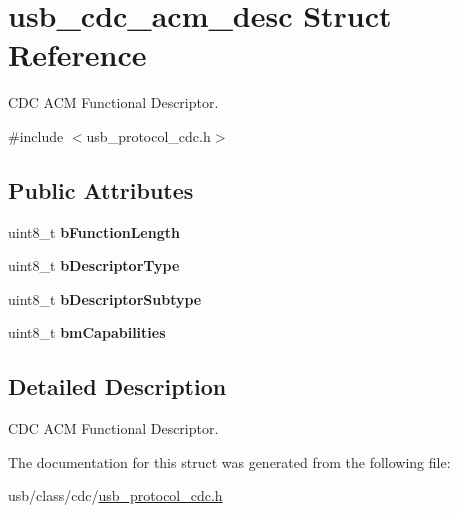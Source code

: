 \hypertarget{structusb__cdc__acm__desc}{}\section{usb\+\_\+cdc\+\_\+acm\+\_\+desc Struct Reference}
\label{structusb__cdc__acm__desc}


C\+DC A\+CM Functional Descriptor.  




{\ttfamily \#include $<$usb\+\_\+protocol\+\_\+cdc.\+h$>$}

\subsection*{Public Attributes}
\begin{DoxyCompactItemize}
\item 
\mbox{\label{structusb__cdc__acm__desc_a035fc7ee5ee746794256d7fd8de0ab3a}} 
uint8\+\_\+t {\bfseries b\+Function\+Length}
\item 
\mbox{\label{structusb__cdc__acm__desc_aa86418c5a633783e4c8f3af866d09d00}} 
uint8\+\_\+t {\bfseries b\+Descriptor\+Type}
\item 
\mbox{\label{structusb__cdc__acm__desc_aba54e9cf6a941870ca1810ce4f39465b}} 
uint8\+\_\+t {\bfseries b\+Descriptor\+Subtype}
\item 
\mbox{\label{structusb__cdc__acm__desc_a175b77082a65c2232cc5650d720b86f4}} 
uint8\+\_\+t {\bfseries bm\+Capabilities}
\end{DoxyCompactItemize}


\subsection{Detailed Description}
C\+DC A\+CM Functional Descriptor. 

The documentation for this struct was generated from the following file\+:\begin{DoxyCompactItemize}
\item 
usb/class/cdc/\hyperlink{usb__protocol__cdc_8h}{usb\+\_\+protocol\+\_\+cdc.\+h}\end{DoxyCompactItemize}
